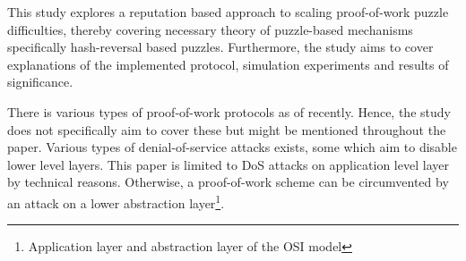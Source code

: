 This study explores a reputation based approach to scaling proof-of-work puzzle difficulties, thereby covering necessary theory of puzzle-based mechanisms specifically hash-reversal based puzzles. Furthermore, the study aims to cover explanations of the implemented protocol, simulation experiments and results of significance. 

There is various types of proof-of-work protocols as of recently. Hence, the study does not specifically aim to cover these but might be mentioned throughout the paper. Various types of denial-of-service attacks exists, some which aim to disable lower level layers. This paper is limited to DoS attacks on application level layer by technical reasons. Otherwise, a proof-of-work scheme can be circumvented by an attack on a lower abstraction layer\footnote{Application layer and abstraction layer of the OSI model}.
\begin{comment}
Scope: \\
The coverage of this study ..... \\
The study consists of ..... \\
The study covers the ..... \\
This study is focus on ..... \\

Delimitations: \\
The study does not cover the ..... \\
The researcher limited this research to ..... \\
This study is limited to ..... \\
\end{comment}